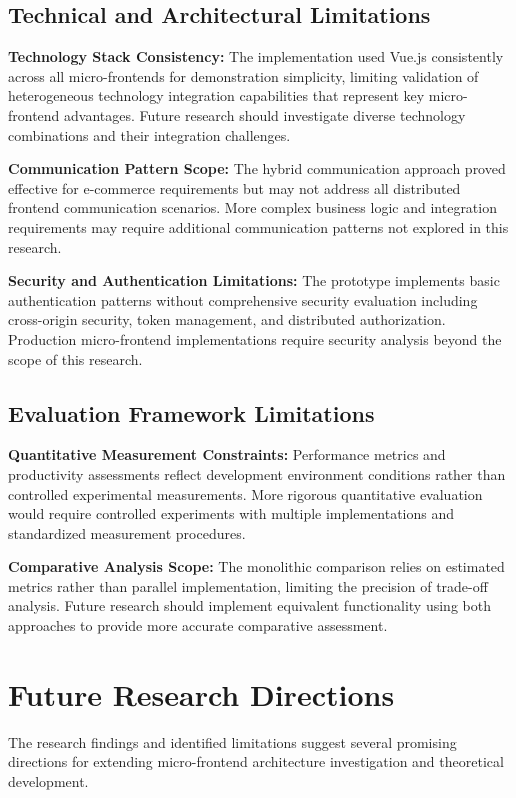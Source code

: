 \documentclass[12pt,a4paper]{report}
\begin{document}
\subsection{Technical and Architectural Limitations}

\textbf{Technology Stack Consistency:} The implementation used Vue.js consistently across all micro-frontends for demonstration simplicity, limiting validation of heterogeneous technology integration capabilities that represent key micro-frontend advantages. Future research should investigate diverse technology combinations and their integration challenges.

\textbf{Communication Pattern Scope:} The hybrid communication approach proved effective for e-commerce requirements but may not address all distributed frontend communication scenarios. More complex business logic and integration requirements may require additional communication patterns not explored in this research.

\textbf{Security and Authentication Limitations:} The prototype implements basic authentication patterns without comprehensive security evaluation including cross-origin security, token management, and distributed authorization. Production micro-frontend implementations require security analysis beyond the scope of this research.

\subsection{Evaluation Framework Limitations}

\textbf{Quantitative Measurement Constraints:} Performance metrics and productivity assessments reflect development environment conditions rather than controlled experimental measurements. More rigorous quantitative evaluation would require controlled experiments with multiple implementations and standardized measurement procedures.

\textbf{Comparative Analysis Scope:} The monolithic comparison relies on estimated metrics rather than parallel implementation, limiting the precision of trade-off analysis. Future research should implement equivalent functionality using both approaches to provide more accurate comparative assessment.

\section{Future Research Directions}

The research findings and identified limitations suggest several promising directions for extending micro-frontend architecture investigation and theoretical development.
\end{document}
